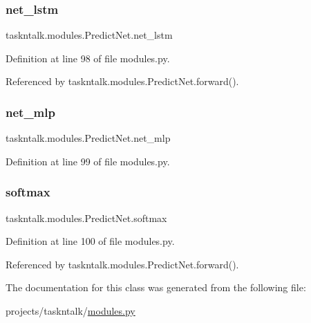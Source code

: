 \subsubsection{\texorpdfstring{net\+\_\+lstm}{net\_lstm}}
{\footnotesize\ttfamily taskntalk.\+modules.\+Predict\+Net.\+net\+\_\+lstm}



Definition at line 98 of file modules.\+py.



Referenced by taskntalk.\+modules.\+Predict\+Net.\+forward().

\mbox{\label{classtaskntalk_1_1modules_1_1PredictNet_a095d419f0221e40a3a82c3c68b07ea63}} 
\subsubsection{\texorpdfstring{net\+\_\+mlp}{net\_mlp}}
{\footnotesize\ttfamily taskntalk.\+modules.\+Predict\+Net.\+net\+\_\+mlp}



Definition at line 99 of file modules.\+py.

\mbox{\label{classtaskntalk_1_1modules_1_1PredictNet_ad5625f1758b0a4f7fbc9dd7ce43094b0}} 
\subsubsection{\texorpdfstring{softmax}{softmax}}
{\footnotesize\ttfamily taskntalk.\+modules.\+Predict\+Net.\+softmax}



Definition at line 100 of file modules.\+py.



Referenced by taskntalk.\+modules.\+Predict\+Net.\+forward().



The documentation for this class was generated from the following file\+:\begin{DoxyCompactItemize}
\item 
projects/taskntalk/\hyperlink{projects_2taskntalk_2modules_8py}{modules.\+py}\end{DoxyCompactItemize}
